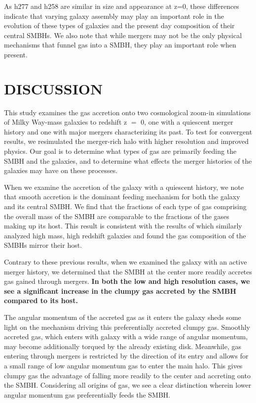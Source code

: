 \documentclass[12pt,headA,chapB]{fiskthesis}
\begin{document}
As h277 and h258 are similar in size and appearance at z=0, these differences indicate that varying galaxy assembly may play an important role in the evolution of these types of galaxies and the present day composition of their central SMBHs. We also note that while mergers may not be the only physical mechanisms that funnel gas into a SMBH, they play an important role when present.




\chapter{\normalsize DISCUSSION}
\thispagestyle{empty}
This study examines the gas accretion onto two cosmological zoom-in simulations of Milky Way-mass galaxies to redshift z $=$ 0, one with a quiescent merger history and one with major mergers characterizing its past. To test for convergent results, we resimulated the merger-rich halo with higher resolution and improved physics. Our goal is to determine what types of gas are primarily feeding the SMBH and the galaxies, and to determine what effects the merger histories of the galaxies may have on these processes.

When we examine the accretion of the galaxy with a quiescent history, we note that smooth accretion is the dominant feeding mechanism for both the galaxy and its central SMBH. We find that the fractions of each type of gas comprising the overall mass of the SMBH are comparable to the fractions of the gases making up its host. This result is consistent with the results of \cite{Bellovary2013} which similarly analyzed high mass, high redshift galaxies and found the gas composition of the SMBHs mirror their host.

Contrary to these previous results, when we examined the galaxy with an active merger history, we determined that the SMBH at the center more readily accretes gas gained through mergers. \textbf{In both the low and high resolution cases, we see a significant increase in the clumpy gas accreted by the SMBH compared to its host.} 

The angular momentum of the accreted gas as it enters the galaxy sheds some light on the mechanism driving this preferentially accreted clumpy gas. Smoothly accreted gas, which enters with galaxy with a wide range of angular momentum, may become additionally torqued by the already existing disk. Meanwhile, gas entering through mergers is restricted by the direction of its entry and allows for a small range of low angular momentum gas to enter the main halo. This gives clumpy gas the advantage of falling more readily to the center and accreting onto the SMBH. Considering all origins of gas, we see a clear distinction wherein lower angular momentum gas preferentially feeds the SMBH.
\end{document}
